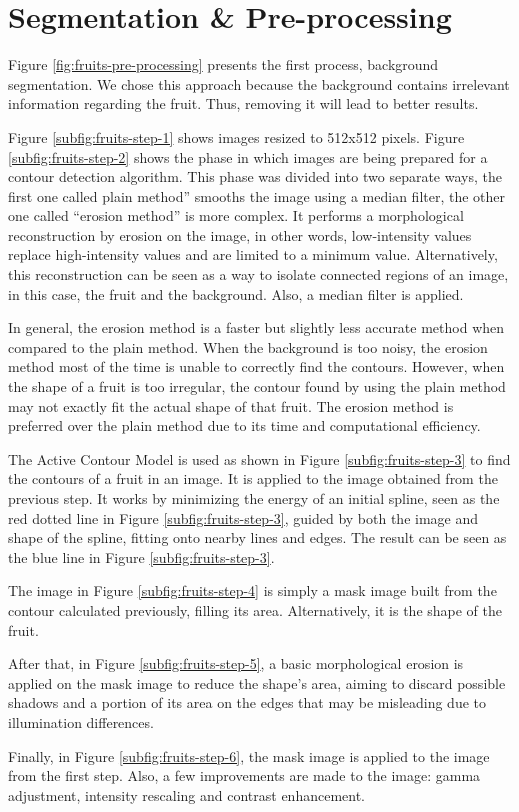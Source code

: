 \documentclass[../main.tex]{subfile}
\begin{document}
\section{Segmentation \& Pre-processing} \label{sec:segmentation-&-preprocesing}


Figure \ref{fig:fruits-pre-processing} presents the first process, background segmentation. We chose this approach because the background contains irrelevant information regarding the fruit. Thus, removing it will lead to better results.

Figure \ref{subfig:fruits-step-1} shows images resized to 512x512 pixels. Figure \ref{subfig:fruits-step-2} shows the phase in which images are being prepared for a contour detection algorithm.
This phase was divided into two separate ways, the first one called plain method'' smooths the image using a median filter, the other one called ``erosion method'' is more complex.
It performs a morphological reconstruction by erosion on the image, in other words, low-intensity values replace high-intensity values and are limited to a minimum value. Alternatively, this reconstruction can be seen as a way to isolate connected regions of an image, in this case, the fruit and the background. Also, a median filter is applied.

In general, the erosion method is a faster but slightly less accurate method when compared to the plain method. When the background is too noisy, the erosion method most of the time is unable to correctly find the contours. However, when the shape of a fruit is too irregular, the contour found by using the plain method may not exactly fit the actual shape of that fruit. The erosion method is preferred over the plain method due to its time and computational efficiency.

The Active Contour Model \cite{III-item1} is used as shown in Figure \ref{subfig:fruits-step-3} to find the contours of a fruit in an image. It is applied to the image obtained from the previous step. It works by minimizing the energy of an initial spline, seen as the red dotted line in Figure \ref{subfig:fruits-step-3}, guided by both the image and shape of the spline, fitting onto nearby lines and edges. The result can be seen as the blue line in Figure \ref{subfig:fruits-step-3}.

The image in Figure \ref{subfig:fruits-step-4} is simply a mask image built from the contour calculated previously, filling its area. Alternatively, it is the shape of the fruit.

After that, in Figure \ref{subfig:fruits-step-5}, a basic morphological erosion is applied on the mask image to reduce the shape's area, aiming to discard possible shadows and a portion of its area on the edges that may be misleading due to illumination differences.

Finally, in Figure \ref{subfig:fruits-step-6}, the mask image is applied to the image from the first step. Also, a few improvements are made to the image: gamma adjustment, intensity rescaling and contrast enhancement.
\end{document}
